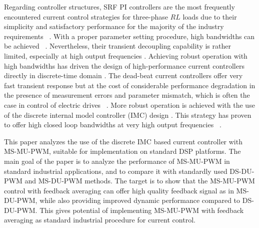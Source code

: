 \documentclass[journal]{IEEEtran}
\begin{document}
Regarding controller structures, SRF PI controllers are the most frequently encountered current control strategies for three-phase $RL$ loads due to their simplicity and satisfactory performance for the majority of the industry requirements ~\cite{rowan1986,bae2003,yepes2014}. With a proper parameter setting procedure, high bandwidths can be achieved ~\cite{yepes2014,holmes2009}. Nevertheless, their transient decoupling capability is rather limited, especially at high output frequencies \cite{lorenz2000}. Achieving robust operation with high bandwidths has driven the design of high-performance current controllers directly in discrete-time domain \cite{bae2003} \cite{lorenz2010}. The dead-beat current controllers offer very fast transient response but at the cost of considerable performance degradation in the presence of measurement errors and parameter mismatch, which is often the case in control of electric drives ~\cite{malesani1999,xu2019,rovere2018}. More robust operation is achieved with the use of the discrete internal model controller (IMC) design \cite{lorenz2010}. This strategy has proven to offer high closed loop bandwidths at very high output frequencies ~\cite{commentsHoffmann,vuksa2016,petric2021a}.

This paper analyzes the use of the discrete IMC based current controller with MS-MU-PWM, suitable for implementation on standard DSP platforms. The main goal of the paper is to analyze the performance of MS-MU-PWM in standard industrial applications, and to compare it with standardly used DS-DU-PWM and MS-DU-PWM methods. 
The target is to show that the MS-MU-PWM control with feedback averaging can offer high quality feedback signal as in MS-DU-PWM, while also providing improved dynamic performance compared to DS-DU-PWM. This gives potential of implementing MS-MU-PWM with feedback averaging as standard industrial procedure for current control.
\end{document}
